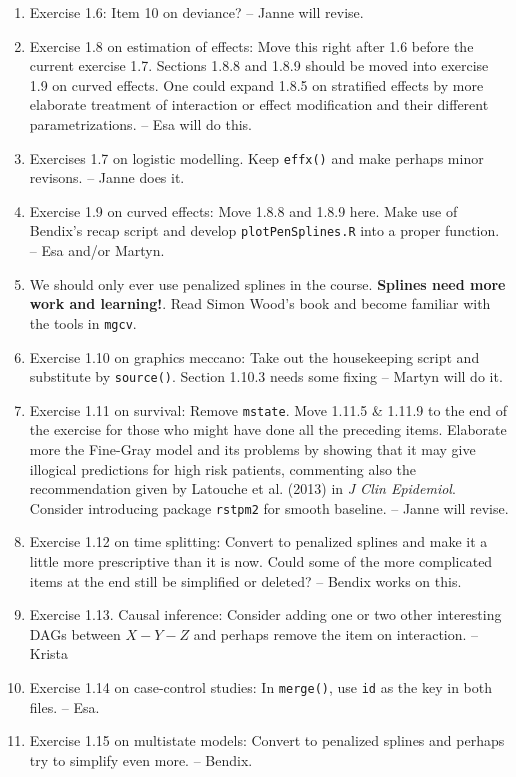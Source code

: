 \begin{enumerate}
\item Exercise 1.6: Item 10 on deviance? -- Janne will revise.
\item Exercise 1.8 on estimation of effects: Move this right after 1.6 before the current 
exercise 1.7. Sections 1.8.8 and 1.8.9 should be moved into exercise 1.9 on curved effects.
One could expand 1.8.5 on stratified effects by more elaborate treatment
of interaction or effect modification and their different parametrizations.
-- Esa will do this.
\item Exercises 1.7 on logistic modelling. Keep \texttt{effx()} and make perhaps minor revisons.
-- Janne does it.
\item Exercise 1.9 on curved effects: Move 1.8.8 and 1.8.9 here.
Make use of Bendix's recap script and develop \texttt{plotPenSplines.R}
into a proper function. -- Esa and/or Martyn.
\item We should only ever use penalized splines in the course.
	\textbf{Splines need more work and learning!}. Read Simon Wood's book and
  become familiar with the tools in \texttt{mgcv}.
\item Exercise 1.10 on graphics meccano: Take out the housekeeping script and substitute by
\texttt{source()}. Section 1.10.3 needs some fixing -- Martyn will do it.
\item Exercise 1.11 on survival: Remove \texttt{mstate}. Move 1.11.5 \& 1.11.9 to the end  of the
exercise for those who might have done all the preceding items. Elaborate more 
the Fine-Gray model and its problems by  showing that it may give illogical predictions for high risk patients, commenting also
the recommendation given by Latouche et al. (2013) in \textit{J Clin Epidemiol}.
Consider introducing package \texttt{rstpm2} for smooth baseline. -- Janne will revise.
\item Exercise 1.12 on time splitting: Convert to penalized splines and  
make it a little more prescriptive than it is now. Could some of the
more complicated items at the end still be simplified or deleted? 
-- Bendix works on this.
\item Exercise 1.13. Causal inference: Consider adding one or two other
 interesting DAGs between $X-Y-Z$
and perhaps remove the item on interaction. -- Krista
\item Exercise 1.14 on case-control studies: In \texttt{merge()}, use \texttt{id}
as the key in both files. -- Esa.
\item Exercise 1.15 on multistate models: Convert to penalized splines and perhaps
try to simplify even more. --  Bendix.  
\end{enumerate}

